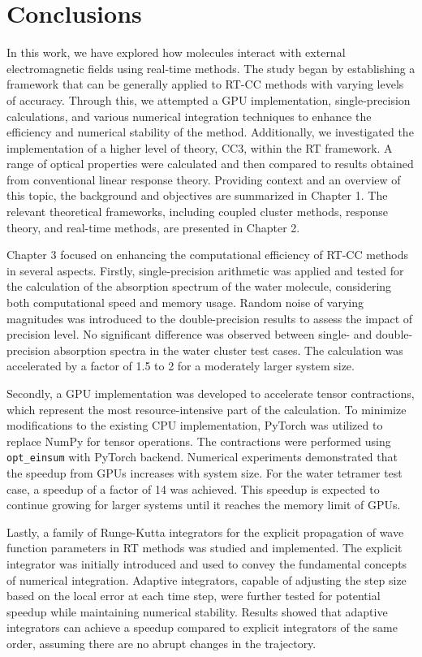 \chapter{Conclusions} \label{conc}
In this work, we have explored how molecules interact with external electromagnetic fields using real-time methods. The study began by establishing a framework that can be generally applied to RT-CC methods with varying levels of accuracy. Through this, we attempted a GPU implementation, single-precision calculations, and various numerical integration techniques to enhance the efficiency and numerical stability of the method. Additionally, we investigated the implementation of a higher level of theory, CC3, within the RT framework. A range of optical properties were calculated and then compared to results obtained from conventional linear response theory. Providing context and an overview of this topic, the background and objectives are summarized in Chapter 1. The relevant theoretical frameworks, including coupled cluster methods, response theory, and real-time methods, are presented in Chapter 2.

Chapter 3 focused on enhancing the computational efficiency of RT-CC methods in several aspects. Firstly, single-precision arithmetic was applied and tested for the calculation of the absorption spectrum of the water molecule, considering both computational speed and memory usage. Random noise of varying magnitudes was introduced to the double-precision results to assess the impact of precision level. No significant difference was observed between single- and double-precision absorption spectra in the water cluster test cases. The calculation was accelerated by a factor of 1.5 to 2 for a moderately larger system size.

Secondly, a GPU implementation was developed to accelerate tensor contractions, which represent the most resource-intensive part of the calculation. To minimize modifications to the existing CPU implementation, PyTorch was utilized to replace NumPy for tensor operations. The contractions were performed using {\tt opt\_einsum} with PyTorch backend. Numerical experiments demonstrated that the speedup from GPUs increases with system size. For the water tetramer test case, a speedup of a factor of 14 was achieved. This speedup is expected to continue growing for larger systems until it reaches the memory limit of GPUs.

Lastly, a family of Runge-Kutta integrators for the explicit propagation of wave function parameters in RT methods was studied and implemented. The explicit integrator was initially introduced and used to convey the fundamental concepts of numerical integration. Adaptive integrators, capable of adjusting the step size based on the local error at each time step, were further tested for potential speedup while maintaining numerical stability. Results showed that adaptive integrators can achieve a speedup compared to explicit integrators of the same order, assuming there are no abrupt changes in the trajectory.

